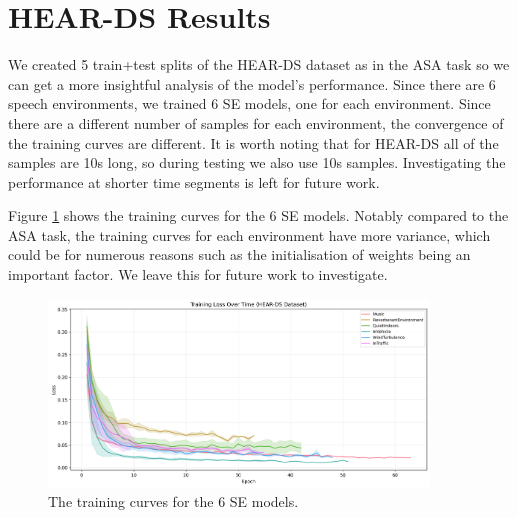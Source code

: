 \documentclass[logo,bsc,singlespacing,parskip,online]{infthesis}
\begin{document}

% 

\section{HEAR-DS Results}
We created 5 train+test splits of the HEAR-DS dataset as in the ASA task so we can 
get a more insightful analysis of the model's performance. Since there 
are 6 speech environments, we trained 6 SE models, one for each environment. 
Since there are a different number of samples for each environment, 
the convergence of the training curves are different. 
It is worth noting that for HEAR-DS all of the samples are 10s long,
so during testing we also use 10s samples. Investigating 
the performance at shorter time segments is left for future work.

Figure \ref{fig:hear-ds-training-curves} shows the training curves for the 
6 SE models. Notably compared to the ASA task, the training curves for each 
environment have more variance, which could be for numerous reasons such 
as the initialisation of weights being an important factor. We leave this 
for future work to investigate.

\begin{figure}[h]
   \centering
   \includegraphics[width=0.9\textwidth]{se-hear-ds_training_losses.png}
   \caption{The training curves for the 6 SE models.}
   \label{fig:hear-ds-training-curves}
\end{figure}
\end{document}
